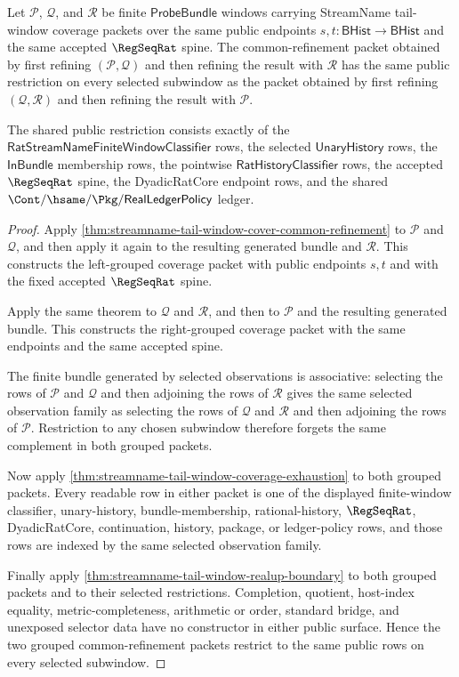 \begin{theorem}
\label{thm:streamname-tail-window-refinement-associativity}
Let $\mathcal P$, $\mathcal Q$, and $\mathcal R$ be finite
$\mathsf{ProbeBundle}$ windows carrying StreamName tail-window coverage
packets over the same public endpoints
$s,t:\mathsf{BHist}\to\mathsf{BHist}$ and the same accepted $\RegSeqRat$
spine. The common-refinement packet obtained by first refining
$(\mathcal P,\mathcal Q)$ and then refining the result with $\mathcal R$ has
the same public restriction on every selected subwindow as the packet obtained
by first refining $(\mathcal Q,\mathcal R)$ and then refining the result with
$\mathcal P$.

The shared public restriction consists exactly of the
$\mathsf{RatStreamNameFiniteWindowClassifier}$ rows, the selected
$\mathsf{UnaryHistory}$ rows, the $\mathsf{InBundle}$ membership rows, the
pointwise $\mathsf{RatHistoryClassifier}$ rows, the accepted $\RegSeqRat$
spine, the DyadicRatCore endpoint rows, and the shared
$\Cont/\hsame/\Pkg/\mathsf{RealLedgerPolicy}$ ledger.
\end{theorem}
\begin{proof}
Apply
\autoref{thm:streamname-tail-window-cover-common-refinement} to
$\mathcal P$ and $\mathcal Q$, and then apply it again to the resulting
generated bundle and $\mathcal R$. This constructs the left-grouped coverage
packet with public endpoints $s,t$ and with the fixed accepted $\RegSeqRat$
spine.

Apply the same theorem to $\mathcal Q$ and $\mathcal R$, and then to
$\mathcal P$ and the resulting generated bundle. This constructs the
right-grouped coverage packet with the same endpoints and the same accepted
spine.

The finite bundle generated by selected observations is associative: selecting
the rows of $\mathcal P$ and $\mathcal Q$ and then adjoining the rows of
$\mathcal R$ gives the same selected observation family as selecting the rows
of $\mathcal Q$ and $\mathcal R$ and then adjoining the rows of $\mathcal P$.
Restriction to any chosen subwindow therefore forgets the same complement in
both grouped packets.

Now apply
\autoref{thm:streamname-tail-window-coverage-exhaustion} to both grouped
packets. Every readable row in either packet is one of the displayed
finite-window classifier, unary-history, bundle-membership,
rational-history, $\RegSeqRat$, DyadicRatCore, continuation, history,
package, or ledger-policy rows, and those rows are indexed by the same
selected observation family.

Finally apply \autoref{thm:streamname-tail-window-realup-boundary} to both
grouped packets and to their selected restrictions. Completion, quotient,
host-index equality, metric-completeness, arithmetic or order, standard
bridge, and unexposed selector data have no constructor in either public
surface. Hence the two grouped common-refinement packets restrict to the same
public rows on every selected subwindow.
\end{proof}

